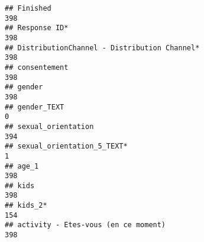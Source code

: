 \documentclass[
]{article}
\begin{document}
\begin{verbatim}
## Finished                                                                                                                                                                                                                   398
## Response ID*                                                                                                                                                                                                               398
## DistributionChannel - Distribution Channel*                                                                                                                                                                                398
## consentement                                                                                                                                                                                                               398
## gender                                                                                                                                                                                                                     398
## gender_TEXT                                                                                                                                                                                                                  0
## sexual_orientation                                                                                                                                                                                                         394
## sexual_orientation_5_TEXT*                                                                                                                                                                                                   1
## age_1                                                                                                                                                                                                                      398
## kids                                                                                                                                                                                                                       398
## kids_2*                                                                                                                                                                                                                    154
## activity - Etes-vous (en ce moment)                                                                                                                                                                                        398

\end{verbatim}
\end{document}
